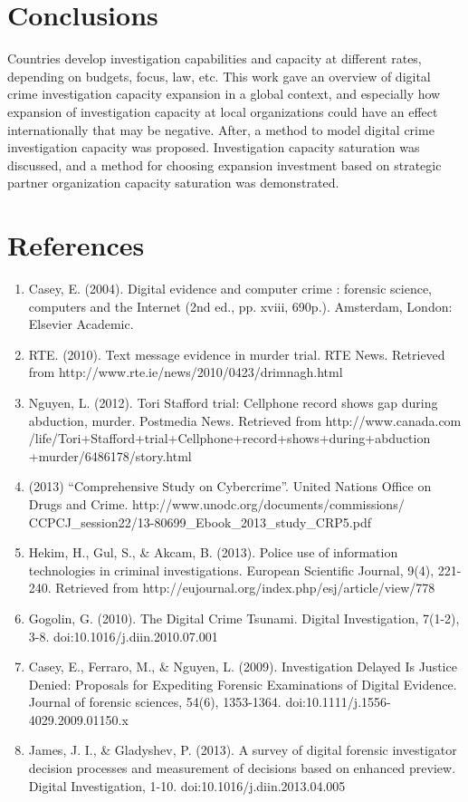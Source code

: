 \documentclass[10pt,a4paper]{article}
\begin{document}
\section{Conclusions}
Countries develop investigation capabilities and capacity at different rates, depending on budgets, focus, law, etc. This work gave an overview of digital crime investigation capacity expansion in a global context, and especially how expansion of investigation capacity at local organizations could have an effect internationally that may be negative. After, a method to model digital crime investigation capacity was proposed. Investigation capacity saturation was discussed, and a method for choosing expansion investment based on strategic partner organization capacity saturation was demonstrated.

\section*{References}
\begin{enumerate}
\item Casey, E. (2004). Digital evidence and computer crime : forensic science, computers and the Internet (2nd ed., pp. xviii, 690p.). Amsterdam, London: Elsevier Academic.
\item RTE. (2010). Text message evidence in murder trial. RTE News. Retrieved from http://www.rte.ie/news/2010/0423/drimnagh.html
\item Nguyen, L. (2012). Tori Stafford trial: Cellphone record shows gap during abduction, murder. Postmedia News. Retrieved from http://www.canada.com\\/life/Tori+Stafford+trial+Cellphone+record+shows+during+abduction\\+murder/6486178/story.html
\item (2013) ``Comprehensive Study on Cybercrime''. United Nations Office on Drugs and Crime. http://www.unodc.org/documents/commissions/\\CCPCJ\_session22/13-80699\_Ebook\_2013\_study\_CRP5.pdf
\item Hekim, H., Gul, S., \& Akcam, B. (2013). Police use of information technologies in criminal investigations. European Scientific Journal, 9(4), 221-240. Retrieved from http://eujournal.org/index.php/esj/article/view/778
\item Gogolin, G. (2010). The Digital Crime Tsunami. Digital Investigation, 7(1-2), 3-8. doi:10.1016/j.diin.2010.07.001
\item Casey, E., Ferraro, M., \& Nguyen, L. (2009). Investigation Delayed Is Justice Denied: Proposals for Expediting Forensic Examinations of Digital Evidence. Journal of forensic sciences, 54(6), 1353-1364. doi:10.1111/j.1556-4029.2009.01150.x
\item James, J. I., \& Gladyshev, P. (2013). A survey of digital forensic investigator decision processes and measurement of decisions based on enhanced preview. Digital Investigation, 1-10. doi:10.1016/j.diin.2013.04.005
\end{enumerate}
\end{document}
